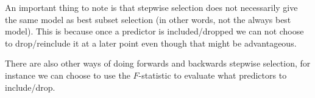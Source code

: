 \documentclass[a4paper, 12pt]{scrartcl}
\begin{document}
An important thing to note is that stepwise selection does not necessarily give the same model as best subset selection (in other words, not the always best model). This is because once a predictor is included/dropped we can not choose to drop/reinclude it at a later point even though that might be advantageous.

There are also other ways of doing forwards and backwards stepwise selection, for instance we can choose to use the $F$-statistic to evaluate what predictors to include/drop.
\end{document}
